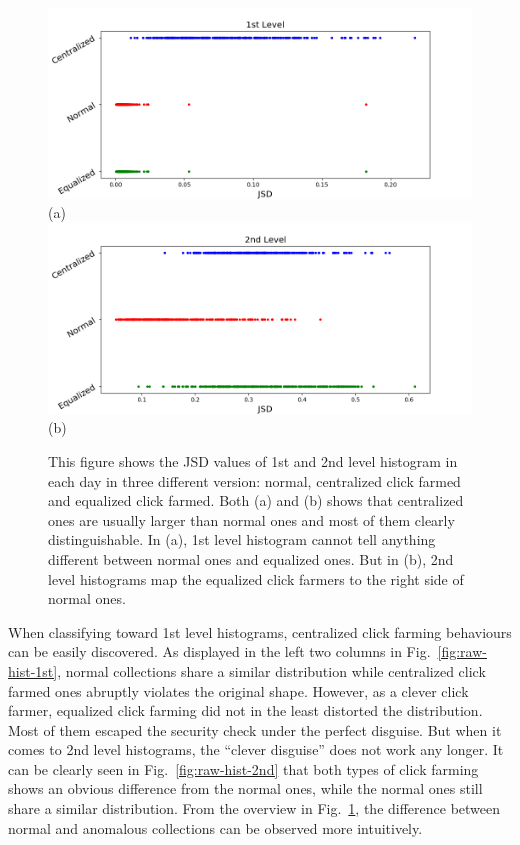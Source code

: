 \documentclass[10pt,conference,letterpaper]{IEEEtran}
\begin{document}
			\begin{figure}[!t]
				\centering
				\includegraphics[width=\linewidth]{fig/RawOverview1st.png}
				(a)
				\includegraphics[width=\linewidth]{fig/RawOverview2nd.png}
				(b)
				\caption{This figure shows the JSD values of 1st and 2nd level histogram in each day in three different version: normal, centralized click farmed and equalized click farmed. Both (a) and (b) shows that centralized ones are usually larger than normal ones and most of them clearly distinguishable. In (a), 1st level histogram cannot tell anything different between normal ones and equalized ones. But in (b), 2nd level histograms map the equalized click farmers to the right side of normal ones.}
				\label{fig:raw-overview}
			\end{figure}
	
			When classifying toward 1st level histograms, centralized click farming behaviours can be easily discovered. As displayed in the left two columns in Fig.~\ref{fig:raw-hist-1st}, normal collections share a similar distribution while centralized click farmed ones abruptly violates the original shape. However, as a clever click farmer, equalized click farming did not in the least distorted the distribution. Most of them escaped the security check under the perfect disguise.
			But when it comes to 2nd level histograms, the ``clever disguise'' does not work any longer. It can be clearly seen in Fig.~\ref{fig:raw-hist-2nd} that both types of click farming shows an obvious difference from the normal ones, while the normal ones still share a similar distribution.
			From the overview in Fig.~\ref{fig:raw-overview}, the difference between normal and anomalous collections can be observed more intuitively.
	
\end{document}
